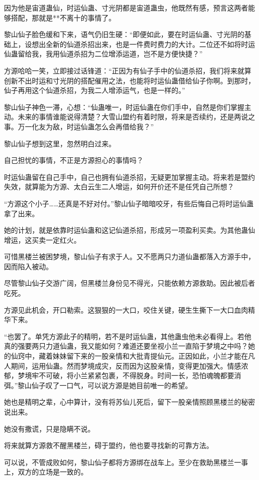 \begin{this_body}
因为他是宙道蛊仙，时运仙蛊、寸光阴都是宙道蛊虫，他既然有感，预言这两者能够搭配，那就是**不离十的事情了。

黎山仙子脸色缓和下来，语气仍旧生硬：“即便如此，要在时运仙蛊、寸光阴的基础上，设想出全新的仙道杀招出来，也是一件费时费力的大计。二位还不如将时运仙蛊留给我，我用仙道杀招为二位增添运道，岂不是方便快捷？”

方源哈哈一笑，立即接过话锋道：“正因为有仙子手中的仙道杀招，我们将来就算创新不出时运和寸光阴的搭配催用之法，也能将时运仙蛊借给仙子你啊。到那时，仙子再用这个仙道杀招，为我二人增添运气，也是一样的。”

黎山仙子神色一滞，心想：“仙蛊唯一，时运仙蛊在你们手中，自然是你们掌握主动。未来的事情谁能说得清楚？大雪山盟约有着时限，将来是否续约，还是两说之事。万一化友为敌，时运仙蛊怎么会再借给我？”

黎山仙子想到这里，忽然明白过来。

自己担忧的事情，不正是方源担心的事情吗？

时运仙蛊留在自己手中，自己也拥有仙道杀招，无疑更加掌握主动。将来若是盟约失效，就算能为方源、太白云生二人增运，如何开价还不是任凭自己所想？

“方源这个小子……还真是不好对付。”黎山仙子暗暗咬牙，有些后悔自己将时运仙蛊拿了出来。

她的计划，就是依靠时运仙蛊和这记仙道杀招，形成另一项盈利买卖。为其他蛊仙增运，这买卖一定红火。

可惜黑楼兰被困梦境，黎山仙子有求于人。又不愿两只力道仙蛊都落入方源手中，因而陷入被动。

尽管黎山仙子交游广阔，但黑楼兰身份见不得光，只能依赖方源救助。因此被后者吃死。

方源见此机会，开口勒索。这狠狠的一大口，咬住关键，硬生生撕下一大口血肉精华下来。

“也罢了。单凭方源此子的精明，若不是时运仙蛊，其他蛊虫他未必看得上。若他真的强要两只力道仙蛊，我又能如何？难道还要坐视小兰一直陷于梦境之中吗？她的仙窍中，藏着妹妹留下来的一股亲情和大批青提仙元。正因如此，小兰才能在凡人期间，运用仙蛊。然而梦境成灾，反而因为这股亲情，变得更加强大。情感浓郁，梦境牢不可破，将小兰紧紧包裹，不得脱身。时间一长，恐怕魂魄都要消弭。”黎山仙子叹了一口气，可以说方源是她目前唯一的希望。

她也是精明之辈，心中算计，没有将苏仙儿死后，留下一股亲情照顾黑楼兰的秘密说出来。

她没有撒谎，只是隐瞒不说。

将来就算方源救不醒黑楼兰，碍于盟约，他也要寻找新的可靠方法。

可以说，不管成败如何，黎山仙子都将方源绑在战车上。至少在救助黑楼兰一事上，双方的立场是一致的。


\end{this_body}
